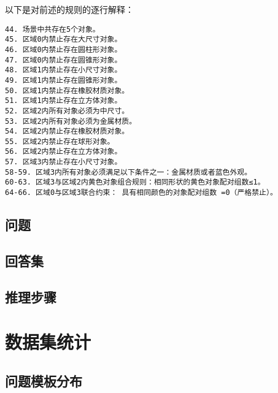 以下是对前述的规则的逐行解释：
\begin{lstlisting}
44. 场景中共存在5个对象。
45. 区域0内禁止存在大尺寸对象。
46. 区域0内禁止存在圆柱形对象。
47. 区域0内禁止存在圆锥形对象。
48. 区域1内禁止存在小尺寸对象。
49. 区域1内禁止存在圆锥形对象。
50. 区域1内禁止存在橡胶材质对象。
51. 区域1内禁止存在立方体对象。
52. 区域2内所有对象必须为中尺寸。
53. 区域2内所有对象必须为金属材质。
54. 区域2内禁止存在橡胶材质对象。
55. 区域2内禁止存在球形对象。
56. 区域2内禁止存在立方体对象。
57. 区域3内禁止存在小尺寸对象。
58-59. 区域3内所有对象必须满足以下条件之一：金属材质或者蓝色外观。
60-63. 区域3与区域2内黄色对象组合规则：相同形状的黄色对象配对组数≤1。
64-66. 区域0与区域3联合约束： 具有相同颜色的对象配对组数 =0（严格禁止）。
\end{lstlisting}

\subsection{问题}

\subsection{回答集}

\subsection{推理步骤}

\section{数据集统计}
\subsection{问题模板分布}